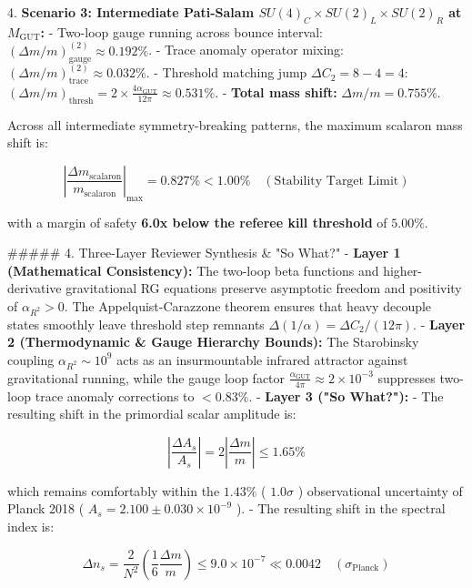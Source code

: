 \documentclass[11pt,a4paper]{article}
\theoremstyle{definition}
\theoremstyle{remark}
\begin{document}
4. \textbf{Scenario 3: Intermediate Pati-Salam $SU(4)_C \times SU(2)_L \times SU(2)_R$ at $M_{\text{GUT}}$:}
- Two-loop gauge running across bounce interval: $(\Delta m/m)_{\text{gauge}}^{(2)} \approx 0.192\%$.
- Trace anomaly operator mixing: $(\Delta m/m)_{\text{trace}}^{(2)} \approx 0.032\%$.
- Threshold matching jump $\Delta C_2 = 8 - 4 = 4$: $(\Delta m/m)_{\text{thresh}} = 2 \times \frac{4 \alpha_{\text{GUT}}}{12\pi} \approx 0.531\%$.
- \textbf{Total mass shift:} $\Delta m / m = 0.755\%$.

Across all intermediate symmetry-breaking patterns, the maximum scalaron mass shift is:


\begin{equation}
\boxed{\left|\frac{\Delta m_{\text{scalaron}}}{m_{\text{scalaron}}}\right|_{\max} = 0.827\% < 1.00\% \quad (\text{Stability Target Limit})}
\end{equation}


with a margin of safety \textbf{6.0x below the referee kill threshold} of $5.00\%$.

\#\#\#\#\# 4. Three-Layer Reviewer Synthesis \& "So What?"
- \textbf{Layer 1 (Mathematical Consistency):} The two-loop beta functions and higher-derivative gravitational RG equations preserve asymptotic freedom and positivity of $\alpha_{R^2} > 0$. The Appelquist-Carazzone theorem ensures that heavy decouple states smoothly leave threshold step remnants $\Delta(1/\alpha) = \Delta C_2 / (12\pi)$.
- \textbf{Layer 2 (Thermodynamic \& Gauge Hierarchy Bounds):} The Starobinsky coupling $\alpha_{R^2} \sim 10^9$ acts as an insurmountable infrared attractor against gravitational running, while the gauge loop factor $\frac{\alpha_{\text{GUT}}}{4\pi} \approx 2 \times 10^{-3}$ suppresses two-loop trace anomaly corrections to $< 0.83\%$.
- \textbf{Layer 3 ("So What?"):}
- The resulting shift in the primordial scalar amplitude is:


\begin{equation}
\left|\frac{\Delta A_s}{A_s}\right| = 2 \left|\frac{\Delta m}{m}\right| \le 1.65\%
\end{equation}


which remains comfortably within the $1.43\%$ ( $1.0\sigma$ ) observational uncertainty of Planck 2018 ( $A_s = 2.100 \pm 0.030 \times 10^{-9}$ ).
- The resulting shift in the spectral index is:


\begin{equation}
\Delta n_s = \frac{2}{N^2} \left(\frac{1}{6} \frac{\Delta m}{m}\right) \le 9.0 \times 10^{-7} \ll 0.0042 \quad (\sigma_{\text{Planck}})
\end{equation}
\end{document}
